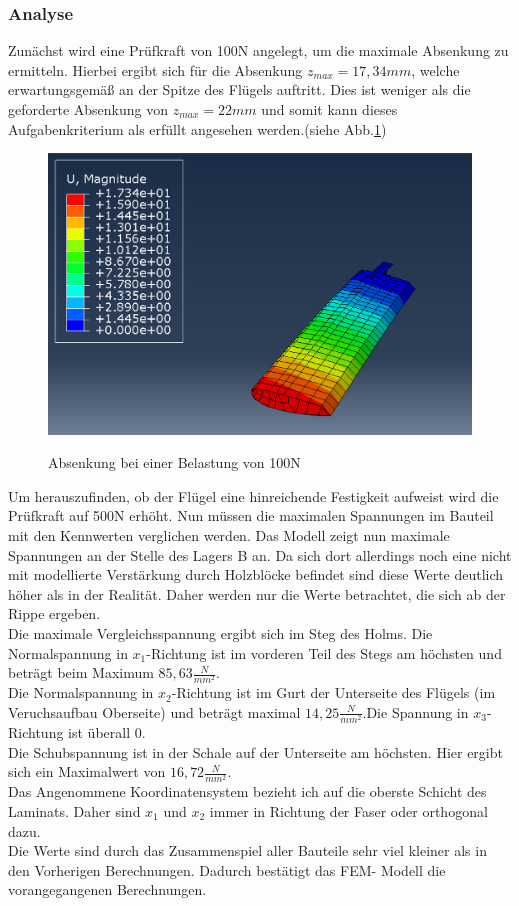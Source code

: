 \subsubsection{Analyse}
Zunächst wird eine Prüfkraft von 100N angelegt, um die maximale Absenkung zu ermitteln. Hierbei ergibt sich für die Absenkung $z_{max}=17,34mm$, welche erwartungsgemäß an der Spitze des Flügels auftritt. Dies ist weniger als die geforderte Absenkung von $z_{max}=22mm$ und somit kann dieses Aufgabenkriterium als erfüllt angesehen werden.(siehe Abb.\ref{Absenkung})
\begin{figure}[h]
 \centering
 \includegraphics[scale=0.4]{Bilder/Absenkung_100N}
 \label{Absenkung}
 \caption{Absenkung bei einer Belastung von 100N}
\end{figure}
\newpage
Um herauszufinden, ob der Flügel eine hinreichende Festigkeit aufweist wird die Prüfkraft auf 500N erhöht. Nun müssen die maximalen Spannungen im Bauteil mit den Kennwerten verglichen werden. Das Modell zeigt nun maximale Spannungen an der Stelle des Lagers B an. Da sich dort allerdings noch eine nicht mit modellierte Verstärkung durch Holzblöcke befindet sind diese Werte deutlich höher als in der Realität. Daher werden nur die Werte betrachtet, die sich ab der Rippe ergeben.\\
 Die maximale Vergleichsspannung ergibt sich im Steg des Holms. Die Normalspannung in $x_{1}$-Richtung ist im vorderen Teil des Stegs am höchsten und beträgt beim Maximum $85,63\frac{N}{mm^2}$.\\
Die Normalspannung in $x_{2}$-Richtung ist im Gurt der Unterseite des Flügels (im Veruchsaufbau Oberseite) und beträgt maximal $14,25\frac{N}{mm^2}$.Die Spannung in $x_{3}$-Richtung ist überall 0.\\
Die Schubspannung ist in der Schale auf der Unterseite am höchsten. Hier ergibt sich ein Maximalwert von $16,72\frac{N}{mm^2}$.\\
Das Angenommene Koordinatensystem bezieht ich auf die oberste Schicht des Laminats. Daher sind $x_{1}$ und $x_{2}$ immer in Richtung der Faser oder orthogonal dazu.\\
Die Werte sind durch das Zusammenspiel aller Bauteile sehr viel kleiner als in den Vorherigen Berechnungen. Dadurch bestätigt das FEM- Modell die vorangegangenen Berechnungen.
\newpage

